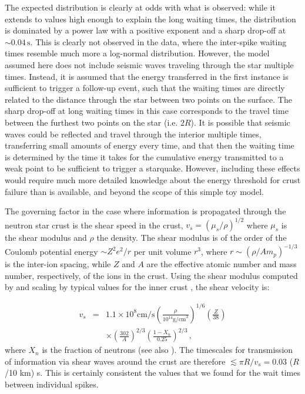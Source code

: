 \documentclass[12pt]{emulateapj}
\begin{document}
The expected distribution is clearly at odds with what is observed: while it extends to values high enough to explain the long waiting times, the distribution is dominated by a power law with a positive exponent and a sharp drop-off at $\sim\!\! 0.04\,\mathrm{s}$. This is clearly not observed in the data, where the inter-spike waiting times resemble much more a log-normal distribution. However, the model assumed here does not include seismic waves traveling through the star multiple times. Instead, it is assumed that the energy transferred in the first instance is sufficient to trigger a follow-up event, such that the waiting times are directly related to the distance through the star between two points on the surface. The sharp drop-off at long waiting times in this case corresponds to the travel time between the furthest two points on the star (i.e. $2R$). It is possible that seismic waves could be reflected and travel through the interior multiple times, transferring small amounts of energy every time, and that then the waiting time is determined by the time it takes for the cumulative energy transmitted to a weak point to be sufficient to trigger a starquake. However, including these effects would require much more detailed knowledge about the energy threshold for crust failure than is available, and beyond the scope of this simple toy model.  

The governing factor in the case where information is propagated through the neutron star crust is the shear speed in the crust, $v_s = (\mu_s/\rho)^{1/2}$ where $\mu_s$ is the shear modulus and $\rho$ the density. The shear modulus is of the order of the Coulomb potential energy $\sim Z^2e^2/r$ per unit volume $r^3$, where $r\sim(\rho/Am_p)^{-1/3}$ is the inter-ion spacing, while $Z$ and $A$ are the effective atomic number and mass number, respectively, of the ions in the crust. Using the shear modulus computed by \citet{strohmayer1991} and scaling by typical values for the inner crust \citep{douchin2001}, the shear velocity is:

\begin{eqnarray}
v_s & = & 1.1 \times 10^8 \mathrm{cm/s} \left(\frac{\rho}{10^{14} \mathrm{g/cm}^3}\right)^{1/6} \left(\frac{Z}{38}\right) \\
&& \times \left(\frac{302}{A}\right)^{2/3} \left(\frac{1-X_n}{0.25}\right)^{2/3} \nonumber \, ,
\end{eqnarray}
where $X_n$ is the fraction of neutrons (see also \citet{piro2005}). The timescales for transmission of information via shear waves around the crust are therefore $\lesssim \pi R/v_s = 0.03$ ($R$/10 km) s. This is certainly consistent the values that we found for the wait times between individual spikes. 
\end{document}
